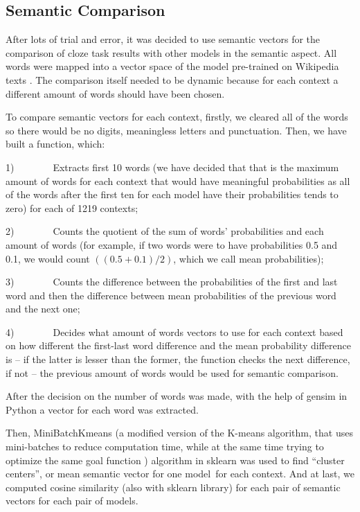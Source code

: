 \documentclass[a4paper]{article}
\begin{document}
\subsection{Semantic Comparison}

After lots of trial and error, it was decided to use semantic vectors for the comparison of cloze task results with other models in the semantic aspect. All words were mapped into a vector space of the model pre-trained on Wikipedia texts \cite{arefyev}. The comparison itself needed to be dynamic because for each context a different amount of words should have been chosen.

To compare semantic vectors for each context, firstly, we cleared all of the words so there would be no digits, meaningless letters and punctuation. Then, we have built a function, which:

1)        Extracts first 10 words (we have decided that that is the maximum amount of words for each context that would have meaningful probabilities as all of the words after the first ten for each model have their probabilities tends to zero) for each of 1219 contexts;

2)        Counts the quotient of the sum of words’ probabilities and each amount of words (for example, if two words were to have probabilities 0.5 and 0.1, we would count $((0.5+0.1)/2)$, which we call mean probabilities);

3)        Counts the difference between the probabilities of the first and last word and then the difference between mean probabilities of the previous word and the next one;

4)        Decides what amount of words vectors to use for each context based on how different the first-last word difference and the mean probability difference is – if the latter is lesser than the former, the function checks the next difference, if not – the previous amount of words would be used for semantic comparison.

After the decision on the number of words was made, with the help of gensim in Python a vector for each word was extracted.

Then, MiniBatchKmeans (a modified version of the K-means algorithm, that uses mini-batches to reduce computation time, while at the same time trying to optimize the same goal function \cite{bejar}) algorithm in sklearn was used to find “cluster centers”, or mean semantic vector for one model for each context. And at last, we computed cosine similarity (also with sklearn library) for each pair of semantic vectors for each pair of models.
\end{document}
